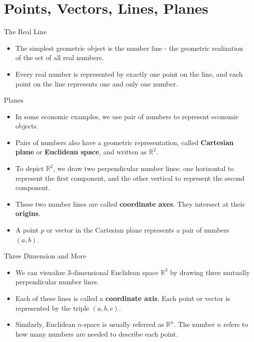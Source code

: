 \documentclass{beamer}
\begin{document}
\section{Points, Vectors, Lines, Planes}
\begin{frame}{The Real Line}
\begin{itemize}
    \item The simplest geometric object is the number line - the geometric realization of the set of all real numbers. 
    \item Every real number is represented by exactly one point on the line, and each point on the line represents one and only one number.
\end{itemize}
\bigskip

\usetikzlibrary{arrows}
\end{frame}


\begin{frame}{Planes}
    \begin{itemize}
        \item In some economic examples, we use pair of numbers to represent economic objects. 
        \item Pairs of numbers also have a geometric representation, called \textbf{Cartesian plane} or \textbf{Euclidean space}, and written as \textbf{$\mathbb{R}^2$}.
      \item   To depict $\mathbb{R}^2$, we draw two perpendicular number lines: one horizontal to represent the first component, and the other vertical to represent the second component. 
      \item These two number lines are called \textbf{coordinate axes}. They intersect at their \textbf{origins}.
      \item A point $p$ or vector  in the Cartesian plane represents a pair of numbers $(a, b)$.
    \end{itemize}
\end{frame}
\begin{frame}{Three Dimension and More}
\begin{itemize}
    \item We can visualize $3$-dimensional Euclidean space $\mathbb{R}^3$ by drawing three mutually perpendicular number lines. 
    \item Each of these lines is called a \textbf{coordinate axis}. Each point or vector is represented by the triple $(a,b,c).$ 
    \item Similarly, Euclidean $n$-space is usually referred as $\mathbb{R}^n$. The number $n$ refers to how many numbers are needed to describe each point. 
\end{itemize}
    
    
\end{frame}
\end{document}
